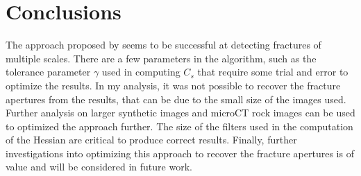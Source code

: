 \documentclass[usletter, 11pt, titlepage]{article}
\begin{document}
\section{Conclusions}
The approach proposed by \cite{Voorn2013} seems to be successful at detecting fractures of multiple scales. There are a few parameters in the algorithm, such as the tolerance parameter $\gamma$ used in computing $C_s$ that require some trial and error to optimize the results. In my analysis, it was not possible to recover the fracture apertures from the results, that can be due to the small size of the images used. Further analysis on larger synthetic images and microCT rock images can be used to optimized the approach further. The size of the filters used in the computation of the Hessian are critical to produce correct results. Finally, further investigations into optimizing this approach to recover the fracture apertures is of value and will be considered in future work.

\clearpage
\newpage
\printbibliography
\end{document}
